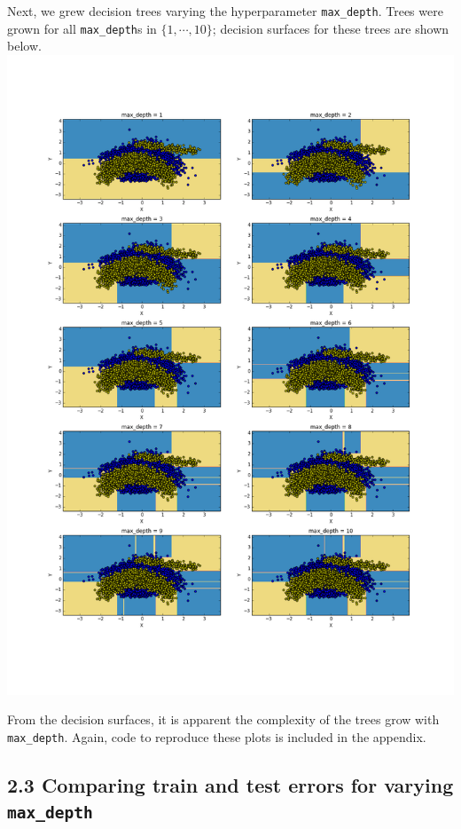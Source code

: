 \documentclass[paper=a4, fontsize=11pt]{scrartcl} %
\numberwithin{equation}{section} %
\numberwithin{figure}{section} %
\numberwithin{table}{section} %
\begin{document}
Next, we grew decision trees varying the hyperparameter \texttt{max\_depth}. Trees were grown for all \texttt{max\_depth}s in $\{1, \cdots, 10\}$; decision surfaces for these trees are shown below.
\includegraphics[scale=0.45]{./../figures/2_1_2.png}

From the decision surfaces, it is apparent the complexity of the trees grow with \texttt{max\_depth}. Again, code to reproduce these plots is included in the appendix.

\subsection*{2.3 Comparing train and test errors for varying \texttt{max\_depth}}
\end{document}
